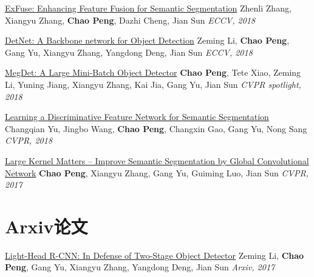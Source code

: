 \documentclass[]{friggeri-cv}
\begin{document}
\href{https://arxiv.org/pdf/1804.03821.pdf}{ExFuse: Enhancing Feature Fusion for Semantic Segmentation}\newline
Zhenli Zhang, Xiangyu Zhang, \textbf{Chao Peng}, Dazhi Cheng, Jian Sun\newline
\emph{ECCV, 2018}

\href{https://arxiv.org/pdf/1804.06215.pdf}{DetNet: A Backbone network for Object Detection} \newline
Zeming Li, \textbf{Chao Peng}, Gang Yu, Xiangyu Zhang, Yangdong Deng, Jian Sun  \newline
\emph{ECCV, 2018}

\href{https://arxiv.org/pdf/1711.07240.pdf}{MegDet: A Large Mini-Batch Object Detector\qquad } \newline
\textbf{Chao Peng}, Tete Xiao, Zeming Li, Yuning Jiang, Xiangyu Zhang, Kai Jia, Gang Yu, \newline
Jian Sun \newline
\emph{CVPR spotlight, 2018}

\href{https://arxiv.org/pdf/1804.09337.pdf}{Learning a Discriminative Feature Network for Semantic Segmentation}\newline
Changqian Yu, Jingbo Wang, \textbf{Chao Peng}, Changxin Gao, Gang Yu, Nong Sang
\newline
\emph{CVPR, 2018}

\href{https://arxiv.org/pdf/1703.02719.pdf}{Large Kernel Matters -- Improve Semantic Segmentation by Global Convolutional Network}
\textbf{Chao Peng}, Xiangyu Zhang, Gang Yu, Guiming Luo, Jian Sun \newline
\emph{CVPR, 2017}

\section{Arxiv论文}
\href{https://arxiv.org/pdf/1711.07264.pdf}{Light-Head R-CNN: In Defense of Two-Stage Object Detector} \newline
Zeming Li, \textbf{Chao Peng}, Gang Yu, Xiangyu Zhang, Yangdong Deng, Jian Sun  \newline
\emph{Arxiv, 2017}


% 
\end{document}
